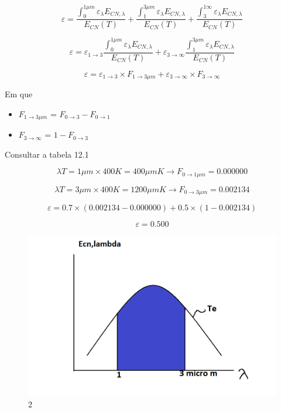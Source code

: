 \documentclass[a4paper, 12pt]{article}
\begin{document}
\[
\varepsilon = \frac{\int _{0}^{1\mu m}\varepsilon _{\lambda}E_{CN,\lambda}}{E_{CN}(T)} + \frac{\int _{1}^{3\mu m}\varepsilon _{\lambda}E_{CN,\lambda}}{E_{CN}(T)} + \frac{\int _{3}^{1\infty}\varepsilon _{\lambda}E_{CN,\lambda}}{E_{CN}(T)}
\]

\[
\varepsilon = \varepsilon _{1 \rightarrow 3} \frac{\int _{0}^{1\mu m}\varepsilon _{\lambda}E_{CN,\lambda}}{E_{CN}(T)} +  \varepsilon _{3 \rightarrow \infty} \frac{\int _{1}^{3\mu m}\varepsilon _{\lambda}E_{CN,\lambda}}{E_{CN}(T)} 
\]

\[
\varepsilon = \varepsilon _{1 \rightarrow 3} \times F_{1 \rightarrow 3\mu m} +  \varepsilon _{3 \rightarrow \infty} \times F_{3 \rightarrow  \infty}
\]

Em que

\begin{itemize}
\item $ F_{1 \rightarrow 3\mu m}$ = $F_{0 \rightarrow 3} - F_{0 \rightarrow 1}$
\item $ F_{3 \rightarrow \infty}$ = $1 - F_{0 \rightarrow 3}$
\end{itemize}


Consultar a tabela 12.1

\[
\lambda T = 1 \mu m \times 400K = 400 \mu mK \rightarrow F_{0 \rightarrow 1\mu m} = 0.000000
\]

\[
\lambda T = 3 \mu m \times 400K = 1200 \mu mK \rightarrow F_{0 \rightarrow 3\mu m} = 0.002134
\]

\[
\varepsilon = 0.7 \times (0.002134 - 0.000000)+0.5 \times (1-0.002134)
\]

\[\varepsilon = 0.500\]

\begin{figure}[h]
\begin{center}
\includegraphics[scale=0.28]{./fig/2.png}
\caption{\label{fig:2}2} 
\end{center}
\end{figure}
\end{document}
